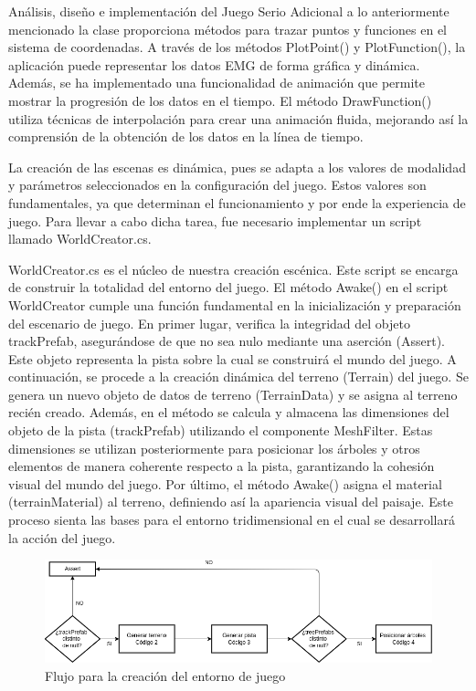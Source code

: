 \begin{thesischapter}{2} {Análisis, diseño e implementación del Juego Serio}
    \vspace{10pt}
    Adicional a lo anteriormente mencionado la clase proporciona métodos para trazar puntos y funciones en el sistema de coordenadas. A través de los métodos PlotPoint() y PlotFunction(), la 
    aplicación puede representar los datos EMG de forma gráfica y dinámica. Además, se ha implementado una funcionalidad de animación que permite mostrar la progresión de los datos en el tiempo. El método 
    DrawFunction() utiliza técnicas de interpolación para crear una animación fluida, mejorando así la comprensión de la obtención de los datos en la línea de tiempo.

    \newpage    
    La creación de las escenas es dinámica, pues se adapta a los valores de 
    modalidad y parámetros seleccionados en la configuración del juego. Estos valores son fundamentales, ya que 
    determinan el funcionamiento y por ende la experiencia de juego. Para llevar a cabo dicha tarea, fue necesario implementar un script 
    llamado WorldCreator.cs.

    \vspace{10pt}
    WorldCreator.cs es el núcleo de nuestra creación escénica. Este script se encarga de construir la totalidad del entorno del 
    juego. El método Awake() en el script WorldCreator cumple una función fundamental en la inicialización y preparación del escenario 
    de juego. En primer lugar, verifica la integridad del objeto trackPrefab, asegurándose de que no sea nulo mediante una aserción (Assert).
    Este objeto representa la pista sobre la cual se construirá el mundo del juego. A continuación, se procede a la creación dinámica del terreno 
    (Terrain) del juego. Se genera un nuevo objeto de datos de terreno (TerrainData) y se asigna al terreno recién creado. Además, en el método se 
    calcula y almacena las dimensiones del objeto de la pista (trackPrefab) utilizando el componente MeshFilter. Estas dimensiones 
    se utilizan posteriormente para posicionar los árboles y otros elementos de manera coherente respecto a la pista, garantizando la cohesión visual 
    del mundo del juego. Por último, el método Awake() asigna el material (terrainMaterial) al terreno, definiendo así la apariencia visual del paisaje.
    Este proceso sienta las bases para el entorno tridimensional en el cual se desarrollará la acción del juego.

    \begin{figure}[ht]
        \centering
        \includegraphics[scale=0.5]{images/generate-world.png}
        \caption{Flujo para la creación del entorno de juego}
        \label{fig: generate-world}
    \end{figure}


\end{thesischapter}
